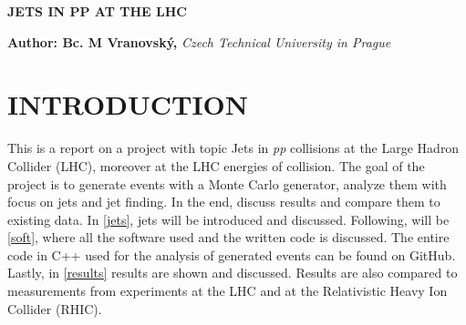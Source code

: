 \documentclass[a4paper,10pt]{article}
\begin{document}
\noindent 
\begin{center}
\textbf{{\Large JETS IN PP AT THE LHC}} \\
\end{center}

\vskip1cm
\noindent 
\textbf{Author: Bc. M Vranovský,} \textit{Czech Technical University in Prague}
\\



\section*{INTRODUCTION}
This is a report on a project with topic Jets in \textit{pp} collisions at the Large Hadron Collider (LHC), moreover at the LHC energies of collision. The goal of the project is to generate events with a Monte Carlo generator, analyze them with focus on jets and jet finding. In the end, discuss results and compare them to existing data. In \autoref{jets}, jets will be introduced and discussed. Following, will be \autoref{soft}, where all the software used and the written code is discussed. The entire code in C++ used for the analysis of generated events can be found on GitHub\cite{GitHubJets}. Lastly, in \autoref{results} results are shown and discussed. Results are also compared to measurements from experiments at the LHC and at the Relativistic Heavy Ion Collider (RHIC).
\end{document}
